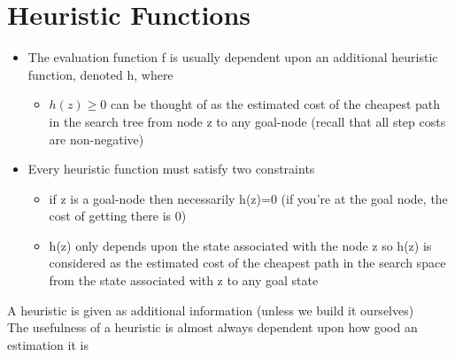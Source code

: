 \documentclass{article}[18pt]
\begin{document}
\section{Heuristic Functions}
\begin{itemize}
	\item The evaluation function f is usually dependent upon an additional heuristic function, denoted h, where
	\begin{itemize}
		\item $h(z)\geqslant 0$ can be thought of as the estimated cost of the cheapest path in the search tree from node z to any goal-node (recall that all step costs are non-negative)
	\end{itemize}
	\item Every heuristic function must satisfy two constraints
	\begin{itemize}
		\item if z is a goal-node then necessarily h(z)=0 (if you're at the goal node, the cost of getting there is 0)
		\item h(z) only depends upon the state associated with the node z so h(z) is considered as the estimated cost of the cheapest path in the search space from the state associated with z to any goal state
	\end{itemize}
\end{itemize}
\begin{important}[Heuristics]
A heuristic is given as additional information (unless we build it ourselves)\\
The usefulness of a heuristic is almost always dependent upon how good an estimation it is
\end{important}
\end{document}
